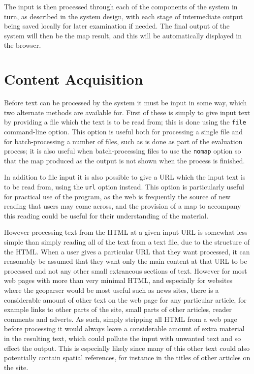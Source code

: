 \documentclass[12pt, a4paper]{report}
\begin{document}
The input is then processed through each of the components of the system in turn, as described in the system design, with each stage of intermediate output being saved locally for later examination if needed. The final output of the system will then be the map result, and this will be automatically displayed in the browser.

\section{Content Acquisition}
\label{content_acquisition}

Before text can be processed by the system it must be input in some way, which two alternate methods are available for. First of these is simply to give input text by providing a file which the text is to be read from; this is done using the \verb#file# command-line option. This option is useful both for processing a single file and for batch-processing a number of files, such as is done as part of the evaluation process; it is also useful when batch-processing files to use the \verb#nomap# option so that the map produced as the output is not shown when the process is finished.

In addition to file input it is also possible to give a URL which the input text is to be read from, using the \verb#url# option instead. This option is particularly useful for practical use of the program, as the web is frequently the source of new reading that users may come across, and the provision of a map to accompany this reading could be useful for their understanding of the material.

However processing text from the HTML at a given input URL is somewhat less simple than simply reading all of the text from a text file, due to the structure of the HTML. When a user gives a particular URL that they want processed, it can reasonably be assumed that they want only the main content at that URL to be processed and not any other small extraneous sections of text. However for most web pages with more than very minimal HTML, and especially for websites where the geoparser would be most useful such as news sites, there is a considerable amount of other text on the web page for any particular article, for example links to other parts of the site, small parts of other articles, reader comments and adverts. As such, simply stripping all HTML from a web page before processing it would always leave a considerable amount of extra material in the resulting text, which could pollute the input with unwanted text and so effect the output. This is especially likely since many of this other text could also potentially contain spatial references, for instance in the titles of other articles on the site.
\end{document}
